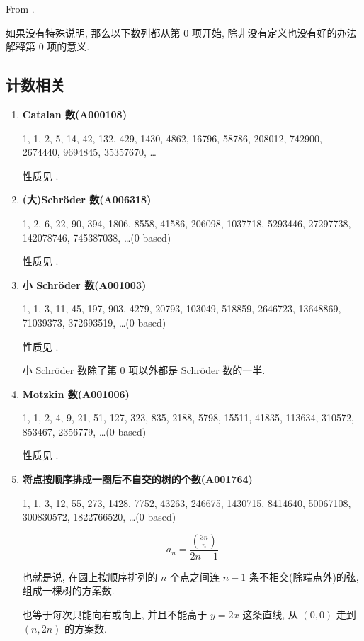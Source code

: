 From \cite{antileafstandard}.

如果没有特殊说明, 那么以下数列都从第 \(0\) 项开始, 除非没有定义也没有好的办法解释第 \(0\) 项的意义.

\subsection{计数相关}

\begin{enumerate}

\item \textbf{Catalan 数(A000108)}

1, 1, 2, 5, 14, 42, 132, 429, 1430, 4862, 16796, 58786, 208012, 742900, 2674440, 9694845, 35357670, \dots

性质见 .

\item \textbf{(大)Schr\"oder 数(A006318)}

1, 2, 6, 22, 90, 394, 1806, 8558, 41586, 206098, 1037718, 5293446, 27297738, 142078746, 745387038, \dots \;(0-based)

性质见 .

\item \textbf{小 Schr\"oder 数(A001003)}

1, 1, 3, 11, 45, 197, 903, 4279, 20793, 103049, 518859, 2646723, 13648869, 71039373, 372693519, \dots \;(0-based)

性质见 .

小 Schr\"oder 数除了第 \(0\) 项以外都是 Schr\"oder 数的一半.

\item \textbf{Motzkin 数(A001006)}

1, 1, 2, 4, 9, 21, 51, 127, 323, 835, 2188, 5798, 15511, 41835, 113634, 310572, 853467, 2356779, \dots \;(0-based)

性质见 .

\item \textbf{将点按顺序排成一圈后不自交的树的个数(A001764)}

1, 1, 3, 12, 55, 273, 1428, 7752, 43263, 246675, 1430715, 8414640, 50067108, 300830572, 1822766520, \dots \;(0-based)

\[
    a_n = \frac {{3n \choose n}} {2n + 1}
\]

也就是说, 在圆上按顺序排列的 \(n\) 个点之间连 \(n - 1\) 条不相交(除端点外)的弦, 组成一棵树的方案数.

也等于每次只能向右或向上, 并且不能高于 \(y = 2x\) 这条直线, 从 \((0, 0)\) 走到 \((n, 2n)\) 的方案数.


\end{enumerate}
